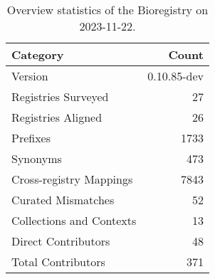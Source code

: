 \begin{table}
\caption{Overview statistics of the Bioregistry on 2023-11-22.}
\label{tab:bioregistry-summary}
\begin{tabular}{lr}
\toprule
Category & Count \\
\midrule
Version & 0.10.85-dev \\
Registries Surveyed & 27 \\
Registries Aligned & 26 \\
Prefixes & 1733 \\
Synonyms & 473 \\
Cross-registry Mappings & 7843 \\
Curated Mismatches & 52 \\
Collections and Contexts & 13 \\
Direct Contributors & 48 \\
Total Contributors & 371 \\
\bottomrule
\end{tabular}
\end{table}
